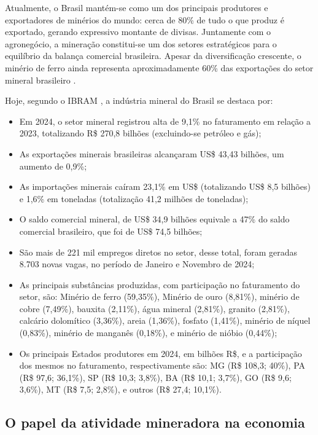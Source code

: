 Atualmente, o Brasil mantém-se como um dos principais produtores e exportadores de minérios do mundo: cerca de 80\% de tudo o que produz é exportado, gerando expressivo montante de divisas. Juntamente com o agronegócio, a mineração constitui-se um dos setores estratégicos para o equilíbrio da balança comercial brasileira. Apesar da diversificação crescente, o minério de ferro ainda representa aproximadamente 60\% das exportações do setor mineral brasileiro \cite{anm2023}.

Hoje, segundo o IBRAM \citeyear{ibram2024}, a indústria mineral do Brasil se destaca por:

\begin{itemize}
    \item Em 2024, o setor mineral registrou alta de 9,1\% no faturamento em relação a 2023, totalizando R\$ 270,8 bilhões (excluindo-se petróleo e gás);
    \item As exportações minerais brasileiras alcançaram US\$ 43,43 bilhões, um aumento de 0,9\%;
    \item As importações minerais caíram 23,1\% em US\$ (totalizando US\$ 8,5 bilhões) e 1,6\% em toneladas (totalização 41,2 milhões de toneladas);
    \item O saldo comercial mineral, de US\$ 34,9 bilhões equivale a 47\% do saldo comercial brasileiro, que foi de US\$ 74,5 bilhões;
    \item São mais de 221 mil empregos diretos no setor, desse total, foram geradas 8.703 novas vagas, no período de Janeiro e Novembro de 2024;
    \item As principais substâncias produzidas, com participação no faturamento do setor, são: Minério de ferro (59,35\%), Minério de ouro (8,81\%), minério de cobre (7,49\%), bauxita (2,11\%), água mineral (2,81\%), granito (2,81\%), calcário dolomítico (3,36\%), areia (1,36\%), fosfato (1,41\%), minério de níquel (0,83\%), minério de manganês (0,18\%), e minério de nióbio (0,44\%);
    \item Os principais Estados produtores em 2024, em bilhões R\$, e a participação dos mesmos no faturamento, respectivamente são: MG (R\$ 108,3; 40\%), PA (R\$ 97,6; 36,1\%), SP (R\$ 10,3; 3,8\%), BA (R\$ 10,1; 3,7\%), GO (R\$ 9,6; 3,6\%), MT (R\$ 7,5; 2,8\%), e outros (R\$ 27,4; 10,1\%).
\end{itemize}

\subsection{O papel da atividade mineradora na economia}
\label{subsec:papel_mineracao_economia}

